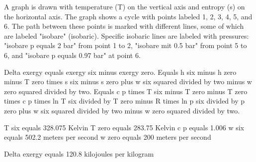 A graph is drawn with temperature (T) on the vertical axis and entropy (s) on the horizontal axis. The graph shows a cycle with points labeled 1, 2, 3, 4, 5, and 6. The path between these points is marked with different lines, some of which are labeled "isobare" (isobaric). Specific isobaric lines are labeled with pressures: "isobare p equals 2 bar" from point 1 to 2, "isobare mit 0.5 bar" from point 5 to 6, and "isobare p equals 0.97 bar" at point 6.

Delta exergy equals exergy six minus exergy zero.  
Equals h six minus h zero minus T zero times s six minus s zero plus w six squared divided by two minus w zero squared divided by two.  
Equals c p times T six minus T zero minus T zero times c p times ln T six divided by T zero minus R times ln p six divided by p zero plus w six squared divided by two minus w zero squared divided by two.  

T six equals 328.075 Kelvin  
T zero equals 283.75 Kelvin  
c p equals 1.006  
w six equals 502.2 meters per second  
w zero equals 200 meters per second  

Delta exergy equals 120.8 kilojoules per kilogram